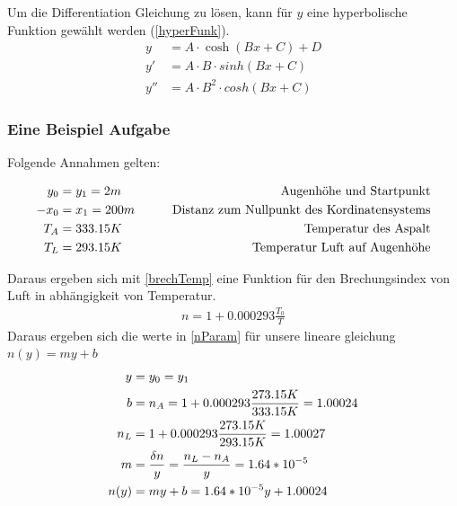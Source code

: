 Um die Differentiation Gleichung zu lösen, kann für $y$ eine hyperbolische Funktion \cite{cosh} gewählt werden (\eqref{hyperFunk}).
\begin{align}
	y&=A\cdot\cosh(Bx+C)+D \label{hyperFunk} \\
	y'&= A\cdot B\cdot sinh(B x + C) \label{hyperFunkDx} \\
	y''&= A\cdot B^2\cdot cosh(B x + C) \label{hyperFunkD2x}
\end{align}


\subsubsection{Eine Beispiel Aufgabe}

Folgende Annahmen gelten:


\begin{align}
	y_0&=y_1=2 m & \text{Augenhöhe und Startpunkt} \notag \\
	-x_0&=x_1 = 200m \qquad& \text{Distanz zum Nullpunkt des Kordinatensystems} \notag \\
	T_A&=333.15 K & \text{Temperatur des Aspalt}  \notag \\
	T_L&=293.15 K & \text{Temperatur Luft auf Augenhöhe}  \notag \\
\end{align}

Daraus ergeben sich mit \eqref{brechTemp} eine Funktion für den Brechungsindex von Luft in abhängigkeit von Temperatur.
\begin{align}
	n=1+0.000293\frac{T_0}{T}
	\label{brechTemp}
\end{align}
Daraus ergeben sich die werte in \eqref{nParam} für unsere lineare gleichung $n(y)=my+b$
\begin{align}
	y&=y_0=y_1 \notag \\
	b&=n_A=1+0.000293\frac{273.15 K}{333.15 K} = 1.00024 \notag \\
	n_L&=1+0.000293\frac{273.15 K}{293.15 K} = 1.00027 \notag \\
	m&=\frac{\delta n}{y}=\frac{n_L-n_A}{y}=1.64*10^{-5} \notag \\
	n(y)&=my+b=1.64*10^{-5}y +1.00024
	\label{nParam}
\end{align}

